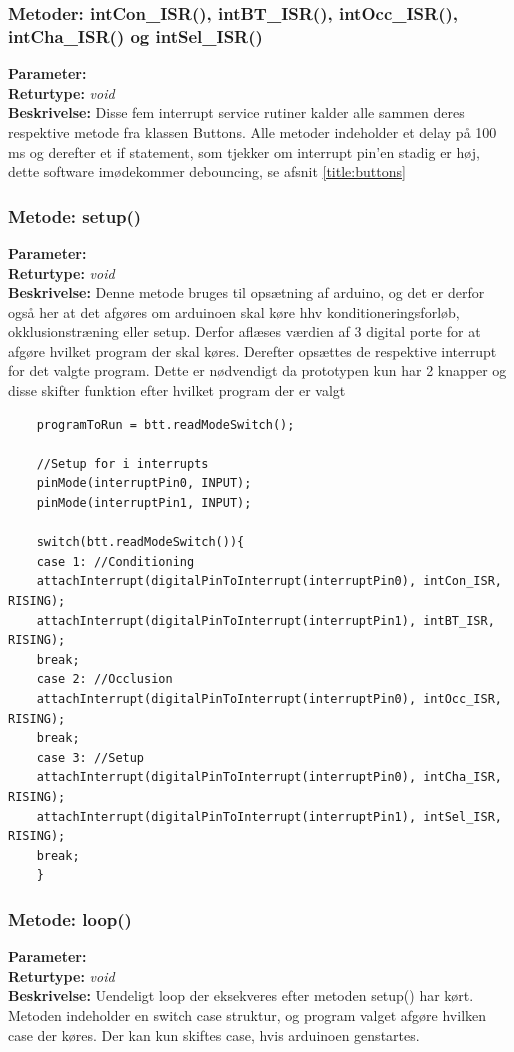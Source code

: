 \subsubsection{Metoder: intCon\_ISR(), intBT\_ISR(), intOcc\_ISR(), intCha\_ISR() og intSel\_ISR()}
\textbf{Parameter: } 
\\ \textbf{Returtype: } \textit{void}
\\ \textbf{Beskrivelse: } Disse fem interrupt service rutiner kalder alle sammen deres respektive metode fra klassen Buttons. Alle metoder indeholder et delay på 100 ms og derefter et if statement, som tjekker om interrupt pin’en stadig er høj, dette software imødekommer debouncing, se afsnit \ref{title:buttons}


\subsubsection{Metode: setup()}
\textbf{Parameter: } 
\\ \textbf{Returtype: } \textit{void}
\\ \textbf{Beskrivelse: } Denne metode bruges til opsætning af arduino, og det er derfor også her at det afgøres om arduinoen skal køre hhv konditioneringsforløb, okklusionstræning eller setup. Derfor aflæses værdien af 3 digital porte for at afgøre hvilket program der skal køres. Derefter opsættes de respektive interrupt for det valgte program. Dette er nødvendigt da prototypen kun har 2 knapper og disse skifter funktion efter hvilket program der er valgt
\begin{lstlisting}
	programToRun = btt.readModeSwitch();
	
	//Setup for i interrupts
	pinMode(interruptPin0, INPUT);
	pinMode(interruptPin1, INPUT);
	
	switch(btt.readModeSwitch()){
	case 1: //Conditioning
	attachInterrupt(digitalPinToInterrupt(interruptPin0), intCon_ISR, RISING);
	attachInterrupt(digitalPinToInterrupt(interruptPin1), intBT_ISR, RISING);
	break;
	case 2: //Occlusion
	attachInterrupt(digitalPinToInterrupt(interruptPin0), intOcc_ISR, RISING);
	break;
	case 3: //Setup
	attachInterrupt(digitalPinToInterrupt(interruptPin0), intCha_ISR, RISING);
	attachInterrupt(digitalPinToInterrupt(interruptPin1), intSel_ISR, RISING);
	break;
	}
\end{lstlisting}

\subsubsection{Metode: loop()}
\textbf{Parameter: }
\\ \textbf{Returtype: } \textit{void}
\\ \textbf{Beskrivelse: } Uendeligt loop der eksekveres efter metoden setup() har kørt. Metoden indeholder en switch case struktur, og program valget afgøre hvilken case der køres. Der kan kun skiftes case, hvis arduinoen genstartes. 